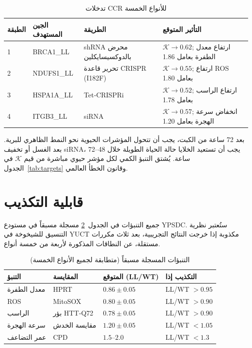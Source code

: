 \documentclass[11pt,a4paper]{article}
\newcommand{\REL}{\mathcal{K}}          %
\begin{document}
	\begin{table}[H]
		\centering
		\caption{تدخلات CCR للأنواع الخمسة}
		\label{tab:CCR}
		\begin{tabular}{@{}llll@{}}
			\toprule
			\textbf{الطبقة} & \textbf{الجين المستهدف} & \textbf{الطريقة} & \textbf{التأثير المتوقع} \\
			\midrule
			1 & BRCA1\_LL & shRNA محرض بالدوكسيسايكلين & \(\REL \to 0.62\); ارتفاع معدل الطفرة بعامل 1.86 \\
			2 & NDUFS1\_LL & تحرير قاعدة CRISPR (I182F) & \(\REL \to 0.55\); ارتفاع ROS بعامل 1.80 \\
			3 & HSPA1A\_LL & Tet‑CRISPRi & \(\REL \to 0.52\); ارتفاع الراسب بعامل 1.78 \\
			4 & ITGB3\_LL & siRNA & \(\REL \to 0.57\); انخفاض سرعة الهجرة بعامل 1.20 \\
			\bottomrule
		\end{tabular}
	\end{table}
	
	بعد 72 ساعة من الكبت، يجب أن تتحول المؤشرات الحيوية نحو النمط الظاهري للبرية. بعد الغسل أو تخفيف siRNA، يجب أن تستعيد الخلايا حالة الحياة الطويلة خلال 48–72 ساعة. يُشتق التنبؤ الكمي لكل مؤشر حيوي مباشرة من قيم \(\REL\) في الجدول~\ref{tab:targets} وقانون الخطأ العالمي.
	
	\section{قابلية التكذيب}
	\label{sec:falsifiability}
	جميع التنبؤات في الجدول~\ref{tab:predictions} مسجلة مسبقاً في مستودع YPSDC. ستُعتبر نظرية التنسيق للشيخوخة في YUCT مكذوبة إذا خرجت النتائج التجريبية، بعد ثلاث مكررات مستقلة، عن النطاقات المذكورة لأربعة من خمسة أنواع.
	
	\begin{table}[H]
		\centering
		\caption{التنبؤات المسجلة مسبقاً (متطابقة لجميع الأنواع الخمسة)}
		\label{tab:predictions}
		\begin{tabular}{@{}llll@{}}
			\toprule
			\textbf{التنبؤ} & \textbf{المقايسة} & \textbf{المتوقع (LL/WT)} & \textbf{التكذيب إذا} \\
			\midrule
			معدل الطفرة       & HPRT           & \(0.86 \pm 0.05\) & LL/WT \(> 0.95\) \\
			ROS               & MitoSOX        & \(0.80 \pm 0.05\) & LL/WT \(> 0.90\) \\
			الراسب            & بؤر HTT‑Q72    & \(0.78 \pm 0.05\) & LL/WT \(> 0.90\) \\
			سرعة الهجرة       & مقايسة الخدش   & \(1.20 \pm 0.05\) & LL/WT \(< 1.05\) \\
			عمر التضاعف       & CPD            & \(1.5\)–\(2.0\)   & LL/WT \(< 1.3\) \\
			\bottomrule
		\end{tabular}
	\end{table}
	
\end{document}
